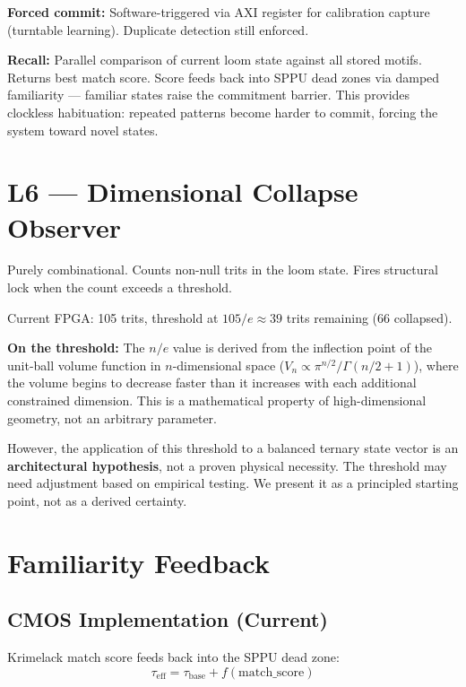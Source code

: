 \documentclass[11pt, a4paper]{article}
\begin{document}
\textbf{Forced commit:} Software-triggered via AXI register
for calibration capture (turntable learning). Duplicate
detection still enforced.

\textbf{Recall:} Parallel comparison of current loom state
against all stored motifs. Returns best match score. Score
feeds back into SPPU dead zones via damped familiarity —
familiar states raise the commitment barrier. This provides
clockless habituation: repeated patterns become harder to
commit, forcing the system toward novel states.

\section{L6 — Dimensional Collapse Observer}

Purely combinational. Counts non-null trits in the loom state.
Fires structural lock when the count exceeds a threshold.

Current FPGA: 105 trits, threshold at $105/e \approx 39$ trits
remaining (66 collapsed).

\textbf{On the threshold:} The $n/e$ value is derived from
the inflection point of the unit-ball volume function in
$n$-dimensional space ($V_n \propto \pi^{n/2} / \Gamma(n/2+1)$),
where the volume begins to decrease faster than it increases
with each additional constrained dimension. This is a
mathematical property of high-dimensional geometry, not an
arbitrary parameter.

However, the application of this threshold to a balanced
ternary state vector is an \textbf{architectural hypothesis},
not a proven physical necessity. The threshold may need
adjustment based on empirical testing. We present it as a
principled starting point, not as a derived certainty.

\section{Familiarity Feedback}

\subsection{CMOS Implementation (Current)}

Krimelack match score feeds back into the SPPU dead zone:
\begin{equation}
  \tau_{\text{eff}} = \tau_{\text{base}} + f(\text{match\_score})
\end{equation}
\end{document}
